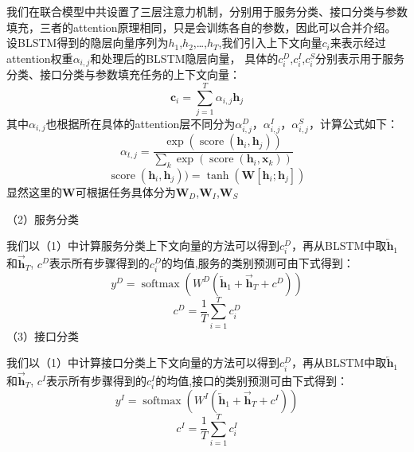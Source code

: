 我们在联合模型中共设置了三层注意力机制，分别用于服务分类、接口分类与参数填充，三者的attention原理相同，只是会训练各自的参数，因此可以合并介绍。
设BLSTM得到的隐层向量序列为$h_{1}$,$h_{2}$,\dots,$h_{T}$,我们引入上下文向量${c}_{i}$来表示经过attention权重$α_{i,j}$和处理后的BLSTM隐层向量，
具体的${c}_{i}^{D}$,${c}_{i}^{I}$,${c}_{i}^{S}$分别表示用于服务分类、接口分类与参数填充任务的上下文向量：
\begin{equation}
    \mathbf{c}_{i}=\sum_{j=1}^{T} \alpha_{i, j} \mathbf{h}_{j}
  \end{equation}
  其中$\alpha_{i, j}$也根据所在具体的attention层不同分为$\alpha_{i, j}^{D}$，$\alpha_{i, j}^{I}$，$\alpha_{i, j}^{S}$，计算公式如下：
  \begin{equation}
    \alpha_{t, j}=\frac{\exp \left(\operatorname{score}\left(\mathbf{h}_{i}, \mathbf{h}_{j}\right)\right)}{\sum_{k} \exp \left(\operatorname{score}\left(\mathbf{h}_{i}, \mathbf{x}_{k}\right)\right)}
    \end{equation}
    \begin{equation}
      \operatorname{score}(\mathbf{h}_{i}, \mathbf{h}_{j}))=\tanh \left(\mathbf{W}\left[\mathbf{h}_{i} ; \mathbf{h}_{j}\right]\right)
    \end{equation}
显然这里的$\mathbf{W}$可根据任务具体分为$\mathbf{W}_D$,$\mathbf{W}_I$,$\mathbf{W}_S$

（2）服务分类

我们以（1）中计算服务分类上下文向量的方法可以得到${c}_{i}^{D}$，再从BLSTM中取$\overleftarrow{\mathbf{h}}_{1}$和$\overrightarrow{\mathbf{h}}_{T}$,
$c^{D}$表示所有步骤得到的$c_i^{D}$的均值,服务的类别预测可由下式得到：
\begin{equation}
    y^{D}=\operatorname{softmax}\left(W^{D}\left(\overleftarrow{\mathbf{h}}_{1}+\overrightarrow{\mathbf{h}}_{T}+c^{D}\right)\right)
  \end{equation}
  \begin{equation}
    c^{D}=\frac{1}{T}\sum_{i=1}^{T} c_i^{D}
  \end{equation}
（3）接口分类

  我们以（1）中计算接口分类上下文向量的方法可以得到${c}_{i}^{D}$，再从BLSTM中取$\overleftarrow{\mathbf{h}}_{1}$和$\overrightarrow{\mathbf{h}}_{T}$,
  $c^{I}$表示所有步骤得到的$c_i^{I}$的均值,接口的类别预测可由下式得到：
  \begin{equation}
      y^{I}=\operatorname{softmax}\left(W^{I}\left(\overleftarrow{\mathbf{h}}_{1}+\overrightarrow{\mathbf{h}}_{T}+c^{I}\right)\right)
    \end{equation} 
    \begin{equation}
        c^{I}=\frac{1}{T}\sum_{i=1}^{T} c_i^{I}
      \end{equation}

